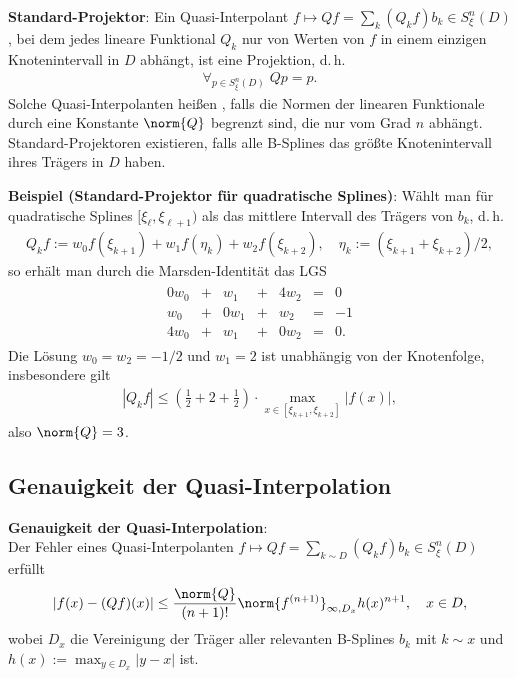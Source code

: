 \linie

\textbf{Standard-Projektor}:
Ein Quasi-Interpolant $f \mapsto Qf = \sum_k (Q_k f) b_k \in S_\xi^n(D)$,
bei dem jedes lineare Funktional $Q_k$ nur von Werten von $f$ in einem einzigen Knotenintervall in
$D$ abhängt, ist eine Projektion, d.\,h.
\begin{align*}
    \forall_{p \in S_\xi^n(D)}\; Qp = p.
\end{align*}
Solche Quasi-Interpolanten heißen , falls die Normen
der linearen Funktionale durch eine Konstante $\norm{Q}$ begrenzt sind, die nur vom Grad $n$
abhängt.
Standard-Projektoren existieren, falls alle B-Splines das größte Knotenintervall ihres
Trägers in $D$ haben.

\linie

\textbf{Beispiel (Standard-Projektor für quadratische Splines)}:
Wählt man für quadratische Splines $[\xi_\ell, \xi_{\ell+1})$ als das mittlere Intervall
des Trägers von $b_k$, d.\,h.
\begin{align*}
    Q_k f := w_0 f(\xi_{k+1}) + w_1 f(\eta_k) + w_2 f(\xi_{k+2}),\quad
    \eta_k := (\xi_{k+1} + \xi_{k+2})/2,
\end{align*}
so erhält man durch die Marsden-Identität das LGS
\begin{align*}
    \begin{array}{rcrcrcc}
        0w_0 & + & w_1 & + & 4w_2 & = & 0\\
        w_0 & + & 0w_1 & + & w_2 & = & -1\\
        4w_0 & + & w_1 & + & 0w_2 & = & 0.
    \end{array}
\end{align*}
Die Lösung $w_0 = w_2 = -1/2$ und $w_1 = 2$ ist unabhängig von der Knotenfolge, insbesondere gilt
\begin{align*}
    |Q_k f| \le \left(\frac{1}{2} + 2 + \frac{1}{2}\right) \cdot
    \max_{x \in [\xi_{k+1}, \xi_{k+2}]} |f(x)|,
\end{align*}
also $\norm{Q} = 3$.

\pagebreak

\subsection{%
    Genauigkeit der Quasi-Interpolation%
}

\textbf{Genauigkeit der Quasi-Interpolation}:\\
Der Fehler eines Quasi-Interpolanten
$f \mapsto Qf = \sum_{k \sim D} (Q_k f) b_k \in S_\xi^n(D)$
erfüllt
\begin{align*}
    |f(x) - (Qf)(x)| \le \frac{\norm{Q}}{(n + 1)!} \norm{f^{(n+1)}}_{\infty,D_x} h(x)^{n+1},\quad
    x \in D,
\end{align*}
wobei $D_x$ die Vereinigung der Träger aller relevanten B-Splines $b_k$ mit $k \sim x$ und\\
$h(x) := \max_{y \in D_x} |y - x|$ ist.

